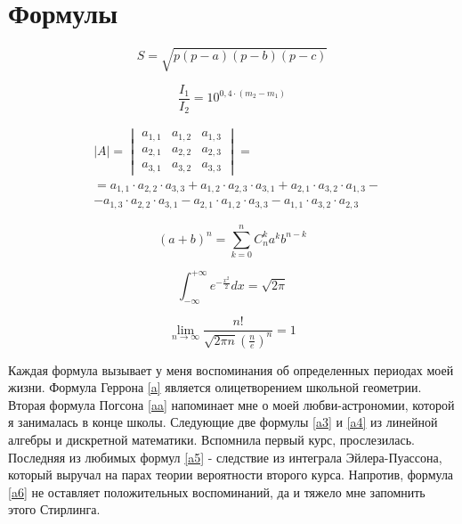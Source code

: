 \documentclass[12pt, a4paper]{article}
\begin{document}
\section{Формулы}

\begin{equation}
S = \sqrt{p(p-a)(p-b)(p-c)}  \tag{\ae} \label{a}
\end{equation}

\begin{equation}
\frac{I_1}{I_2}=10^{ 0,4 \cdot (m_2-m_1) }\tag{\ae\ae}\label{aa}
\end{equation}

\begin{align*}
 & |A| = \begin{vmatrix}
  a_{1,1} & a_{1,2} & a_{1,3} \\
  a_{2,1} & a_{2,2} & a_{2,3} \\
  a_{3,1} & a_{3,2} & a_{3,3}
 \end{vmatrix} = \\
 & = a_{1,1} \cdot a_{2,2} \cdot a_{3,3} + a_{1,2} \cdot a_{2,3} \cdot a_{3,1} +a_{2,1} \cdot a_{3,2} \cdot a_{1,3} - \\
 & - a_{1,3} \cdot a_{2,2} \cdot a_{3,1} - a_{2,1} \cdot a_{1,2} \cdot a_{3,3} - a_{1,1} \cdot a_{3,2} \cdot a_{2,3}
 \tag{\ae\ae\ae} \label{a3}
\end{align*}

\begin{equation}
(a+b)^ n = \sum_{k=0}^{n} C_n^k a^k b^{n-k} \tag{\ae\ae\ae\ae} \label{a4}
\end{equation}

\begin{equation}
\int_{-\infty}^{+\infty} e^{-\frac{x^2}{2}} dx = \sqrt{2\pi} \tag{\ae\ae\ae\ae\ae} \label{a5}
\end{equation}

\begin{equation}
\displaystyle \lim_{n \to \infty} \frac{n!}{\sqrt{2 \pi n} \left(\frac{n}{e}\right)^n} = 1  \tag{\ae\ae\ae\ae\ae\ae} \label{a6}
\end{equation}

Каждая формула вызывает у меня воспоминания об определенных периодах моей жизни. Формула Геррона \eqref{a} является олицетворением школьной геометрии. Вторая формула Погсона \eqref{aa} напоминает мне о моей любви-астрономии, которой я занималась в конце школы. Следующие две формулы \eqref{a3} и \eqref{a4} из линейной алгебры и дискретной математики. Вспомнила первый курс, прослезилась. Последняя из любимых формул \eqref{a5} - следствие из интеграла Эйлера-Пуассона, который выручал на парах теории вероятности второго курса. Напротив, формула \eqref{a6} не оставляет положительных воспоминаний, да и тяжело мне запомнить этого Стирлинга.
\end{document}
